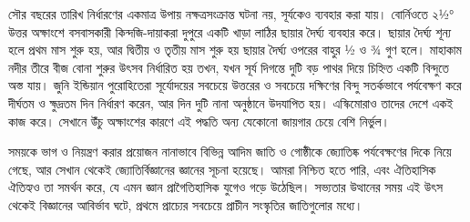 সৌর বছরের তারিখ নির্ধারণের একমাত্র উপায় নক্ষত্রসংক্রান্ত ঘটনা নয়, সূর্যকেও ব্যবহার করা যায়। বোর্নিওতে ২½° উত্তর অক্ষাংশে বসবাসকারী কিন্দজি-দায়াকরা দুপুরে একটি খাড়া লাঠির ছায়ার দৈর্ঘ্য ব্যবহার করে। ছায়ার দৈর্ঘ্য শূন্য হলে প্রথম মাস শুরু হয়, আর দ্বিতীয় ও তৃতীয় মাস শুরু হয় ছায়ার দৈর্ঘ্য ওপরের বাহুর ½ ও ¾ গুণ হলে। মাহাকাম নদীর তীরে বীজ বোনা শুরুর উৎসব নির্ধারিত হয় তখন, যখন সূর্য দিগন্তে দুটি বড় পাথর দিয়ে চিহ্নিত একটি বিন্দুতে অস্ত যায়। জুনি ইন্ডিয়ান পুরোহিতেরা সূর্যোদয়ের সবচেয়ে উত্তরের ও সবচেয়ে দক্ষিণের বিন্দু সতর্কভাবে পর্যবেক্ষণ করে দীর্ঘতম ও ক্ষুদ্রতম দিন নির্ধারণ করেন, আর দিন দুটি নানা অনুষ্ঠানে উদযাপিত হয়। এস্কিমোরাও তাদের দেশে একই কাজ করে। সেখানে উঁচু অক্ষাংশের কারণে এই পদ্ধতি অন্য যেকোনো জায়গার চেয়ে বেশি নির্ভুল।

সময়কে ভাগ ও নিয়ন্ত্রণ করার প্রয়োজন নানাভাবে বিভিন্ন আদিম জাতি ও গোষ্ঠীকে জ্যোতিষ্ক পর্যবেক্ষণের দিকে নিয়ে গেছে, আর সেখান থেকেই জ্যোতির্বিজ্ঞানের জ্ঞানের সূচনা হয়েছে। আমরা নিশ্চিত হতে পারি, এবং ঐতিহাসিক ঐতিহ্যও তা সমর্থন করে, যে এমন জ্ঞান প্রাগৈতিহাসিক যুগেও গড়ে উঠেছিল। সভ্যতার উত্থানের সময় এই উৎস থেকেই বিজ্ঞানের আবির্ভাব ঘটে, প্রথমে প্রাচ্যের সবচেয়ে প্রাচীন সংস্কৃতির জাতিগুলোর মধ্যে।